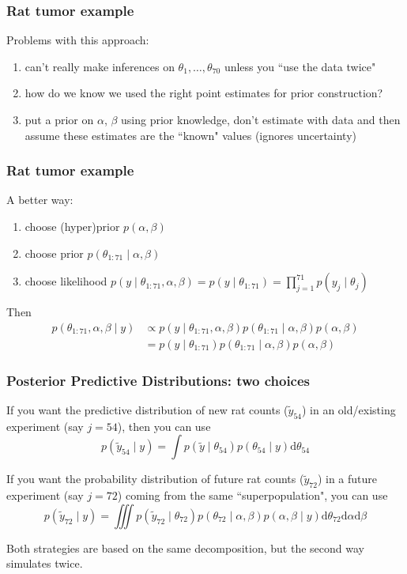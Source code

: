 \documentclass{beamer}
\begin{document}
\begin{frame}
\frametitle{Rat tumor example}

Problems with this approach:

\begin{enumerate}
\item can't really make inferences on $\theta_1, \ldots, \theta_{70}$ unless you ``use the data twice"
\item how do we know we used the right point estimates for prior construction?
\item put a prior on $\alpha$, $\beta$ using prior knowledge, don't estimate with data and then assume these estimates are the ``known" values (ignores uncertainty)
\end{enumerate}


\end{frame}

\begin{frame}
\frametitle{Rat tumor example}

A better way:
\begin{enumerate}
\item choose (hyper)prior $p(\alpha,\beta)$ 
\item choose prior $p(\theta_{1:71} \mid \alpha, \beta)$
\item choose likelihood $p(y \mid \theta_{1:71}, \alpha, \beta) = p(y \mid \theta_{1:71}) = \prod_{j=1}^{71}p(y_j \mid \theta_{j})$
\end{enumerate}

Then 
\begin{align*}
p(\theta_{1:71}, \alpha, \beta \mid y) &\propto p(y \mid \theta_{1:71}, \alpha, \beta)p(\theta_{1:71} \mid \alpha,\beta)p(\alpha,\beta) \tag{Bayes'} \\
&= p(y \mid \theta_{1:71} )p(\theta_{1:71} \mid \alpha, \beta)p(\alpha,\beta) \tag{condtl. indep.} 
\end{align*}


\end{frame}


\begin{frame}
\frametitle{Posterior Predictive Distributions: two choices}

If you want the predictive distribution of new rat counts ($\tilde{y}_{54}$) in an old/existing experiment (say $j=54$), then you can use
\[
p(\tilde{y}_{54} \mid y) = \int p(\tilde{y} \mid \theta_{54})p(\theta_{54} \mid y) \text{d}\theta_{54}
\]

If you want the probability distribution of future rat counts ($\tilde{y}_{72}$) in a future experiment (say $j=72$) coming from the same ``superpopulation", you can use
\[
p(\tilde{y}_{72} \mid y) = \iiint p(\tilde{y}_{72} \mid \theta_{72})p(\theta_{72} \mid \alpha, \beta)p(\alpha,\beta \mid y) \text{d}\theta_{72}\text{d}\alpha \text{d}\beta
\]

Both strategies are based on the same decomposition, but the second way simulates twice.
\end{frame}
\end{document}
